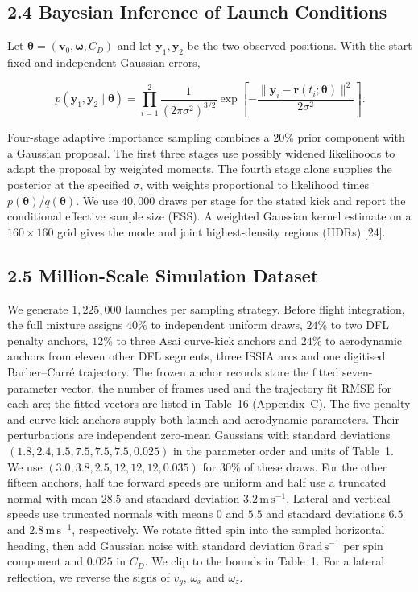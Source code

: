 \subsection{2.4 Bayesian Inference of Launch Conditions}

Let $\boldsymbol{\theta}=(\mathbf{v}_0,\boldsymbol{\omega},C_D)$ and let $\mathbf{y}_1,\mathbf{y}_2$ be the two observed positions. With the start fixed and independent Gaussian errors,

$$
p(\mathbf{y}_1,\mathbf{y}_2\mid\boldsymbol{\theta})
  =\prod_{i=1}^{2}\frac{1}{(2\pi\sigma^2)^{3/2}}
   \exp\!\left[-\frac{\|\mathbf{y}_i-\mathbf{r}(t_i;\boldsymbol{\theta})\|^2}{2\sigma^2}\right].
$$

Four-stage adaptive importance sampling combines a $20\%$ prior component with a Gaussian proposal. The first three stages use possibly widened likelihoods to adapt the proposal by weighted moments. The fourth stage alone supplies the posterior at the specified $\sigma$, with weights proportional to likelihood times $p(\boldsymbol\theta)/q(\boldsymbol\theta)$. We use $40{,}000$ draws per stage for the stated kick and report the conditional effective sample size (ESS). A weighted Gaussian kernel estimate on a $160\times160$ grid gives the mode and joint highest-density regions (HDRs) [24].

\subsection{2.5 Million-Scale Simulation Dataset}

We generate $1{,}225{,}000$ launches per sampling strategy. Before flight integration, the full mixture assigns $40\%$ to independent uniform draws, $24\%$ to two DFL penalty anchors, $12\%$ to three Asai curve-kick anchors and $24\%$ to aerodynamic anchors from eleven other DFL segments, three ISSIA arcs and one digitised Barber--Carr\'e trajectory. The frozen anchor records store the fitted seven-parameter vector, the number of frames used and the trajectory fit RMSE for each arc; the fitted vectors are listed in Table~16 (Appendix~C). The five penalty and curve-kick anchors supply both launch and aerodynamic parameters. Their perturbations are independent zero-mean Gaussians with standard deviations $(1.8,2.4,1.5,7.5,7.5,7.5,0.025)$ in the parameter order and units of Table~1. We use $(3.0,3.8,2.5,12,12,12,0.035)$ for $30\%$ of these draws. For the other fifteen anchors, half the forward speeds are uniform and half use a truncated normal with mean $28.5$ and standard deviation $3.2\,\mathrm{m\,s^{-1}}$. Lateral and vertical speeds use truncated normals with means $0$ and $5.5$ and standard deviations $6.5$ and $2.8\,\mathrm{m\,s^{-1}}$, respectively. We rotate fitted spin into the sampled horizontal heading, then add Gaussian noise with standard deviation $6\,\mathrm{rad\,s^{-1}}$ per spin component and $0.025$ in $C_D$. We clip to the bounds in Table~1. For a lateral reflection, we reverse the signs of $v_y$, $\omega_x$ and $\omega_z$.

